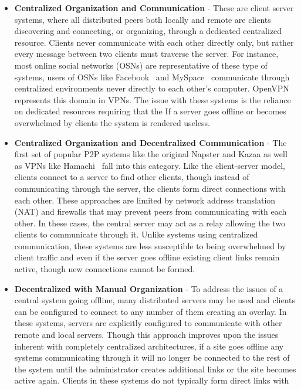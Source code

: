 \begin{itemize}
\item \textbf{Centralized Organization and Communication} - These are client
server systems, where all distributed peers both locally and remote are clients
discovering and connecting, or organizing, through a dedicated centralized
resource. Clients never communicate with each other directly only, but rather
every message between two clients must traverse the server.  For instance, most
online social networks (OSNs) are representative of these type of systems,
users of OSNs like Facebook~\cite{facebook} and MySpace~\cite{myspace}
communicate through centralized environments never directly to each other's
computer.  OpenVPN~\cite{openvpn} represents this domain in VPNs.  The issue
with these systems is the reliance on dedicated resources requiring that the If
a server goes offline or becomes overwhelmed by clients the system is rendered
useless.
\item \textbf{Centralized Organization and Decentralized Communication} - The
first set of popular P2P systems like the original Napster and Kazaa as well
as VPNs like Hamachi~\cite{hamachi} fall into this category.  Like the
client-server model, clients connect to a server to find other clients, though
instead of communicating through the server, the clients form direct
connections with each other.  These approaches are limited by network address
translation (NAT) and firewalls that may prevent peers from communicating with
each other.  In these cases, the central server may act as a relay allowing the
two clients to communicate through it.  Unlike systems using centralized
communication, these systems are less susceptible to being overwhelmed by
client traffic and even if the server goes offline existing client links remain
active, though new connections cannot be formed.
\item \textbf{Decentralized with Manual Organization} - To address the issues
of a central system going offline, many distributed servers may be used and
clients can be configured to connect to any number of them creating an overlay.
In these systems, servers are explicitly configured to communicate with other
remote and local servers.  Though this approach improves upon the issues
inherent with completely centralized architectures, if a site goes offline any
systems communicating through it will no longer be connected to the rest of the
system until the administrator creates additional links or the site becomes
active again.  Clients in these systems do not typically form direct links with

\end{itemize}

